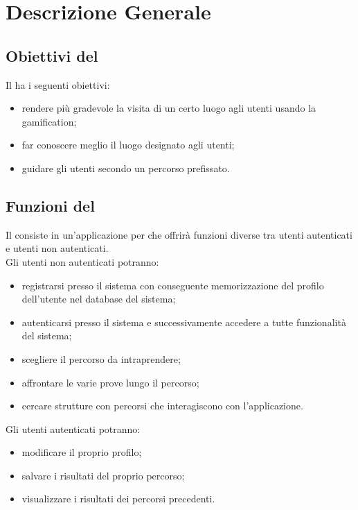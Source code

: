 \section{Descrizione Generale}
\label{sec:DescrizioneGenerale}

	\subsection{Obiettivi del }
	\label{sec:ObiettiviDelProdotto}
		Il  ha i seguenti obiettivi:
		\begin{itemize}
			\item rendere più gradevole la visita di un certo luogo agli utenti usando la gamification;
			\item far conoscere meglio il luogo designato agli utenti;
			\item guidare gli utenti secondo un percorso prefissato.
		\end{itemize}
	
	\subsection{Funzioni del }
	\label{sub:Funzioni del Prodotto}
		Il  consiste in un'applicazione per  che offrirà funzioni diverse tra utenti autenticati e utenti non autenticati. \\
		Gli utenti non autenticati potranno:
		\begin{itemize}
			\item registrarsi presso il sistema con conseguente memorizzazione del profilo dell'utente nel database del sistema;
			\item autenticarsi presso il sistema e successivamente accedere a tutte funzionalità del sistema;
			\item scegliere il percorso da intraprendere;
			\item affrontare le varie prove lungo il percorso;
			\item cercare strutture con percorsi che interagiscono con l'applicazione.
		\end{itemize}
		Gli utenti autenticati potranno:
		\begin{itemize}
			\item modificare il proprio profilo;
			\item salvare i risultati del proprio percorso;
			\item visualizzare i risultati dei percorsi precedenti.
		\end{itemize}
	
